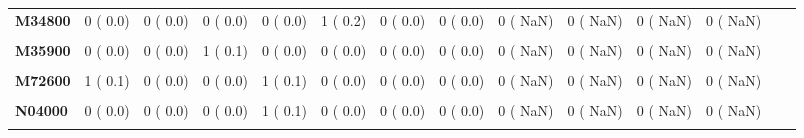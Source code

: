 \documentclass[
]{article}
\begin{document}
\begin{table}[H]
\begin{tabular}[t]{>{\raggedright\arraybackslash}p{5em}ccccccccccccc}
\textbf{M34800} & 0 (  0.0) & 0 (  0.0) & 0 (  0.0) & 0 (  0.0) & 1 (  0.2) & 0 (  0.0) & 0 (  0.0) & 0 (  NaN) & 0 (  NaN) & 0 (  NaN) & 0 (  NaN) &  & \\
\textbf{\cellcolor{gray!10}{M34900}} & \cellcolor{gray!10}{0 (  0.0)} & \cellcolor{gray!10}{0 (  0.0)} & \cellcolor{gray!10}{2 (  0.2)} & \cellcolor{gray!10}{0 (  0.0)} & \cellcolor{gray!10}{0 (  0.0)} & \cellcolor{gray!10}{0 (  0.0)} & \cellcolor{gray!10}{0 (  0.0)} & \cellcolor{gray!10}{0 (  NaN)} & \cellcolor{gray!10}{0 (  NaN)} & \cellcolor{gray!10}{0 (  NaN)} & \cellcolor{gray!10}{0 (  NaN)} & \cellcolor{gray!10}{} & \cellcolor{gray!10}{}\\
\textbf{M35900} & 0 (  0.0) & 0 (  0.0) & 1 (  0.1) & 0 (  0.0) & 0 (  0.0) & 0 (  0.0) & 0 (  0.0) & 0 (  NaN) & 0 (  NaN) & 0 (  NaN) & 0 (  NaN) &  & \\
\textbf{\cellcolor{gray!10}{M62800}} & \cellcolor{gray!10}{0 (  0.0)} & \cellcolor{gray!10}{2 (  0.2)} & \cellcolor{gray!10}{0 (  0.0)} & \cellcolor{gray!10}{0 (  0.0)} & \cellcolor{gray!10}{0 (  0.0)} & \cellcolor{gray!10}{1 (  0.4)} & \cellcolor{gray!10}{0 (  0.0)} & \cellcolor{gray!10}{0 (  NaN)} & \cellcolor{gray!10}{0 (  NaN)} & \cellcolor{gray!10}{0 (  NaN)} & \cellcolor{gray!10}{0 (  NaN)} & \cellcolor{gray!10}{} & \cellcolor{gray!10}{}\\
\textbf{M72600} & 1 (  0.1) & 0 (  0.0) & 0 (  0.0) & 1 (  0.1) & 0 (  0.0) & 0 (  0.0) & 0 (  0.0) & 0 (  NaN) & 0 (  NaN) & 0 (  NaN) & 0 (  NaN) &  & \\
\textbf{\cellcolor{gray!10}{M86900}} & \cellcolor{gray!10}{3 (  0.3)} & \cellcolor{gray!10}{1 (  0.1)} & \cellcolor{gray!10}{1 (  0.1)} & \cellcolor{gray!10}{0 (  0.0)} & \cellcolor{gray!10}{4 (  0.9)} & \cellcolor{gray!10}{0 (  0.0)} & \cellcolor{gray!10}{1 (  0.4)} & \cellcolor{gray!10}{0 (  NaN)} & \cellcolor{gray!10}{0 (  NaN)} & \cellcolor{gray!10}{0 (  NaN)} & \cellcolor{gray!10}{0 (  NaN)} & \cellcolor{gray!10}{} & \cellcolor{gray!10}{}\\
\textbf{N04000} & 0 (  0.0) & 0 (  0.0) & 0 (  0.0) & 1 (  0.1) & 0 (  0.0) & 0 (  0.0) & 0 (  0.0) & 0 (  NaN) & 0 (  NaN) & 0 (  NaN) & 0 (  NaN) &  & \\
\textbf{\cellcolor{gray!10}{N04900}} & \cellcolor{gray!10}{0 (  0.0)} & \cellcolor{gray!10}{0 (  0.0)} & \cellcolor{gray!10}{0 (  0.0)} & \cellcolor{gray!10}{1 (  0.1)} & \cellcolor{gray!10}{0 (  0.0)} & \cellcolor{gray!10}{0 (  0.0)} & \cellcolor{gray!10}{0 (  0.0)} & \cellcolor{gray!10}{0 (  NaN)} & \cellcolor{gray!10}{0 (  NaN)} & \cellcolor{gray!10}{0 (  NaN)} & \cellcolor{gray!10}{0 (  NaN)} & \cellcolor{gray!10}{} & \cellcolor{gray!10}{}\\

\end{tabular}
\end{table}
\end{document}

